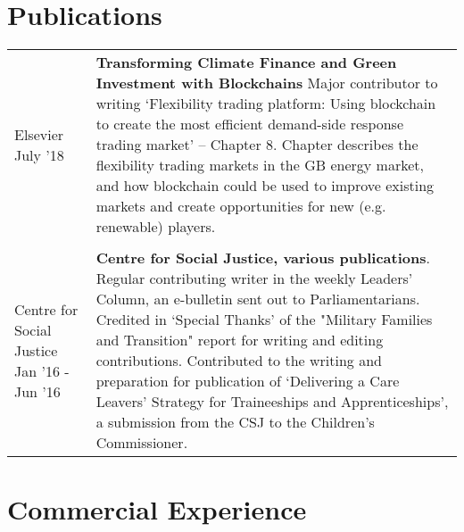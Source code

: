 \documentclass[a4paper,10pt]{article} %
\begin{document}
{\begin{tabular}{ L{4cm} L{15cm} }
	
\end{tabular}

\section{Publications}

\begin{tabular}{ L{4cm} L{14cm} }
	Elsevier \newline July '18  & 
	\textbf{Transforming Climate Finance and Green Investment with Blockchains} \newline
	Major contributor to writing ‘Flexibility trading platform: Using blockchain to create the most efficient demand-side response trading market’ – Chapter 8.
	Chapter describes the flexibility trading markets in the GB energy market, and how blockchain could be used to improve existing markets and create opportunities for new (e.g. renewable) players. \\&\\
	
	Centre for Social Justice \newline Jan '16 - Jun '16 & \textbf{Centre for Social Justice, various publications}. \newline 
	Regular contributing writer in the weekly Leaders’ Column, an e-bulletin sent out to Parliamentarians. \newline 
	Credited in ‘Special Thanks’ of the "Military Families and Transition" report for writing and editing contributions. \newline
	Contributed to the writing and preparation for publication of ‘Delivering a Care Leavers' Strategy for Traineeships and Apprenticeships’, a submission from the CSJ to the Children’s Commissioner.

	
	
\end{tabular}



\section{Commercial Experience}


\begin{tabular}{ L{4cm} L{14cm} }
	

\end{tabular}}
\end{document}
